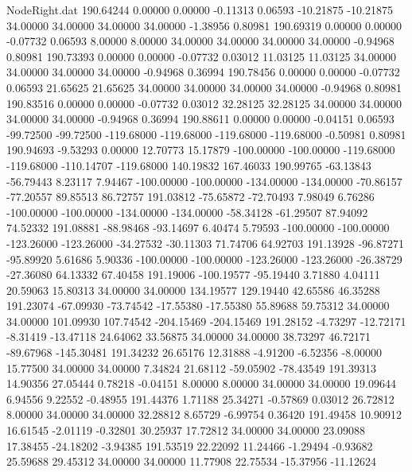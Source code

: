 \begin{filecontents}{NodeRight.dat}
 190.64244    0.00000    0.00000    -0.11313    0.06593  -10.21875  -10.21875   34.00000   34.00000   34.00000   34.00000   -1.38956    0.80981
 190.69319    0.00000    0.00000    -0.07732    0.06593    8.00000    8.00000   34.00000   34.00000   34.00000   34.00000   -0.94968    0.80981
 190.73393    0.00000    0.00000    -0.07732    0.03012   11.03125   11.03125   34.00000   34.00000   34.00000   34.00000   -0.94968    0.36994
 190.78456    0.00000    0.00000    -0.07732    0.06593   21.65625   21.65625   34.00000   34.00000   34.00000   34.00000   -0.94968    0.80981
 190.83516    0.00000    0.00000    -0.07732    0.03012   32.28125   32.28125   34.00000   34.00000   34.00000   34.00000   -0.94968    0.36994
 190.88611    0.00000    0.00000    -0.04151    0.06593  -99.72500  -99.72500 -119.68000 -119.68000 -119.68000 -119.68000   -0.50981    0.80981
 190.94693   -9.53293    0.00000    12.70773   15.17879 -100.00000 -100.00000 -119.68000 -119.68000 -110.14707 -119.68000  140.19832  167.46033
 190.99765  -63.13843  -56.79443     8.23117    7.94467 -100.00000 -100.00000 -134.00000 -134.00000  -70.86157  -77.20557   89.85513   86.72757
 191.03812  -75.65872  -72.70493     7.98049    6.76286 -100.00000 -100.00000 -134.00000 -134.00000  -58.34128  -61.29507   87.94092   74.52332
 191.08881  -88.98468  -93.14697     6.40474    5.79593 -100.00000 -100.00000 -123.26000 -123.26000  -34.27532  -30.11303   71.74706   64.92703
 191.13928  -96.87271  -95.89920     5.61686    5.90336 -100.00000 -100.00000 -123.26000 -123.26000  -26.38729  -27.36080   64.13332   67.40458
 191.19006 -100.19577  -95.19440     3.71880    4.04111   20.59063   15.80313   34.00000   34.00000  134.19577  129.19440   42.65586   46.35288
 191.23074  -67.09930  -73.74542   -17.55380  -17.55380   55.89688   59.75312   34.00000   34.00000  101.09930  107.74542 -204.15469 -204.15469
 191.28152   -4.73297  -12.72171    -8.31419  -13.47118   24.64062   33.56875   34.00000   34.00000   38.73297   46.72171  -89.67968 -145.30481
 191.34232   26.65176   12.31888    -4.91200   -6.52356   -8.00000   15.77500   34.00000   34.00000    7.34824   21.68112  -59.05902  -78.43549
 191.39313   14.90356   27.05444     0.78218   -0.04151    8.00000    8.00000   34.00000   34.00000   19.09644    6.94556    9.22552   -0.48955
 191.44376    1.71188   25.34271    -0.57869    0.03012   26.72812    8.00000   34.00000   34.00000   32.28812    8.65729   -6.99754    0.36420
 191.49458   10.90912   16.61545    -2.01119   -0.32801   30.25937   17.72812   34.00000   34.00000   23.09088   17.38455  -24.18202   -3.94385
 191.53519   22.22092   11.24466    -1.29494   -0.93682   25.59688   29.45312   34.00000   34.00000   11.77908   22.75534  -15.37956  -11.12624

\end{filecontents}
